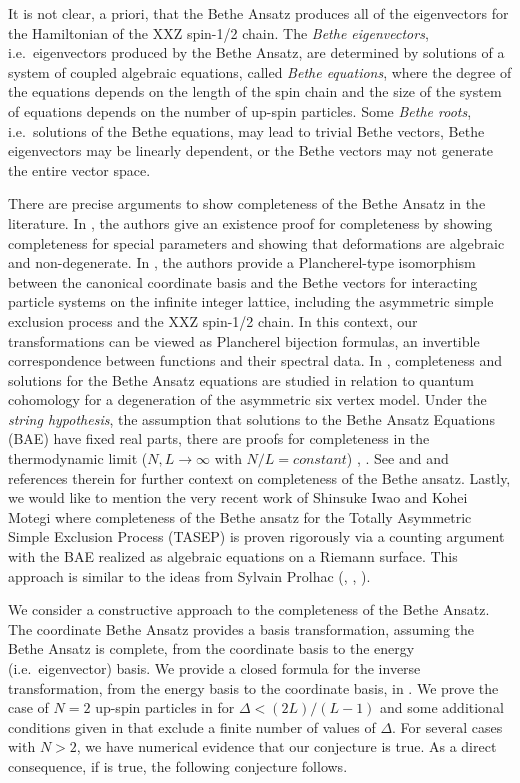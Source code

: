 \documentclass[a4paper,11pt]{article}
\theoremstyle{definition}
\begin{document}
It is not clear, a priori, that the Bethe Ansatz produces all of the eigenvectors for the Hamiltonian of the XXZ spin-1/2 chain. The \emph{Bethe eigenvectors}, i.e.~eigenvectors produced by the Bethe Ansatz, are determined by solutions of a system of coupled algebraic equations, called \emph{Bethe equations}, where the degree of the equations depends on the length of the spin chain and the size of the system of equations depends on the number of up-spin particles. Some \emph{Bethe roots}, i.e.~solutions of the Bethe equations, may lead to trivial Bethe vectors, Bethe eigenvectors may be linearly dependent, or the Bethe vectors may not generate the entire vector space. 

There are precise arguments to show completeness of the Bethe Ansatz in the literature. In \cite{tarasov_completeness_1995}, the authors give an existence proof for completeness by showing completeness for special parameters and showing that deformations are algebraic and non-degenerate. In \cite{borodin_spectral_2015, borodin_spectral_2015-1}, the authors provide a Plancherel-type isomorphism between the canonical coordinate basis and the Bethe vectors for interacting particle systems on the infinite integer lattice, including the asymmetric simple exclusion process and the XXZ spin-1/2 chain. In this context, our transformations can be viewed as Plancherel bijection formulas, an invertible correspondence between functions and their spectral data. In \cite{GORBOUNOV2017282}, completeness and solutions for the Bethe Ansatz equations are studied in relation to quantum cohomology for a degeneration of the asymmetric six vertex model. Under the \emph{string hypothesis}, the assumption that solutions to the Bethe Ansatz Equations (BAE) have fixed real parts, there are proofs for completeness in the thermodynamic limit ($N,L\to\infty$ with $N/L=constant$) \cite{kirillov_completeness_1997}, \cite{Takahashi1971-uq}. See \cite{PhysRevE.88.052113} and \cite{Jiang2018-vm} and references therein for further context on completeness of the Bethe ansatz. Lastly, we would like to mention the very recent work of Shinsuke Iwao and Kohei Motegi \cite{Iwao2025-vv} where completeness of the Bethe ansatz for the Totally Asymmetric Simple Exclusion Process (TASEP) is proven rigorously via a counting argument with the BAE realized as algebraic equations on a Riemann surface. This approach is similar to the ideas from Sylvain Prolhac (\cite{Prolhac2024-fr}, \cite{Prolhac2020-nn}, \cite{Prolhac2022-xq}).

We consider a constructive approach to the completeness of the Bethe Ansatz. The coordinate Bethe Ansatz provides a basis transformation, assuming the Bethe Ansatz is complete, from the coordinate basis to the energy (i.e.~eigenvector) basis. We provide a closed formula for the inverse transformation, from the energy basis to the coordinate basis, in . We prove the case of $N=2$ up-spin particles in  for $\Delta < (2L)/(L-1)$ and some additional conditions given in  that exclude a finite number of values of $\Delta$. For several cases with $N>2$, we have numerical evidence that our conjecture is true. As a direct consequence, if  is true, the following conjecture follows.
\end{document}
